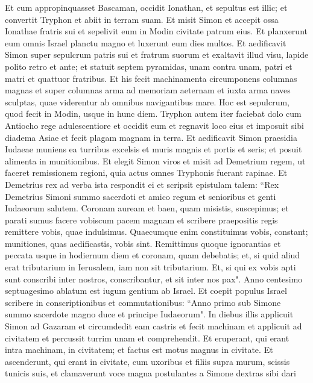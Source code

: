 \begin{biblechapter}
\verse Et cum appropinquasset Bascaman, occidit Ionathan, et sepultus est illic;  
\verse et convertit Tryphon et abiit in terram suam. 
\verse Et misit Simon et accepit ossa Ionathae fratris sui et sepelivit eum in Modin civitate patrum eius. 
\verse Et planxerunt eum omnis Israel planctu magno et luxerunt eum dies multos. 
\verse Et aedificavit Simon super sepulcrum patris sui et fratrum suorum et exaltavit illud visu, lapide polito retro et ante; 
\verse et statuit septem pyramidas, unam contra unam, patri et matri et quattuor fratribus. 
\verse Et his fecit machinamenta circumponens columnas magnas et super columnas arma ad memoriam aeternam et iuxta arma naves sculptas, quae viderentur ab omnibus navigantibus mare. 
\verse Hoc est sepulcrum, quod fecit in Modin, usque in hunc diem. 
\verse Tryphon autem iter faciebat dolo cum Antiocho rege adulescentiore et occidit eum 
\verse et regnavit loco eius et imposuit sibi diadema Asiae et fecit plagam magnam in terra. 
\verse Et aedificavit Simon praesidia Iudaeae muniens ea turribus excelsis et muris magnis et portis et seris; et posuit alimenta in munitionibus. 
\verse Et elegit Simon viros et misit ad Demetrium regem, ut faceret remissionem regioni, quia actus omnes Tryphonis fuerant rapinae. 
\verse Et Demetrius rex ad verba ista respondit ei et scripsit epistulam talem:  
\verse “Rex Demetrius Simoni summo sacerdoti et amico regum et senioribus et genti Iudaeorum salutem. 
\verse Coronam auream et baen, quam misistis, suscepimus; et parati sumus facere vobiscum pacem magnam et scribere praepositis regis remittere vobis, quae indulsimus. 
\verse Quaecumque enim constituimus vobis, constant; munitiones, quas aedificastis, vobis sint. 
\verse Remittimus quoque ignorantias et peccata usque in hodiernum diem et coronam, quam debebatis; et, si quid aliud erat tributarium in Ierusalem, iam non sit tributarium. 
\verse Et, si qui ex vobis apti sunt conscribi inter nostros, conscribantur, et sit inter nos pax". 
\verse Anno centesimo septuagesimo ablatum est iugum gentium ab Israel. 
\verse Et coepit populus Israel scribere in conscriptionibus et commutationibus: “Anno primo sub Simone summo sacerdote magno duce et principe Iudaeorum". 
\verse In diebus illis applicuit Simon ad Gazaram et circumdedit eam castris et fecit machinam et applicuit ad civitatem et percussit turrim unam et comprehendit. 
\verse Et eruperant, qui erant intra machinam, in civitatem; et factus est motus magnus in civitate. 
\verse Et ascenderunt, qui erant in civitate, cum uxoribus et filiis supra murum, scissis tunicis suis, et clamaverunt voce magna postulantes a Simone dextras sibi dari 

\end{biblechapter}
